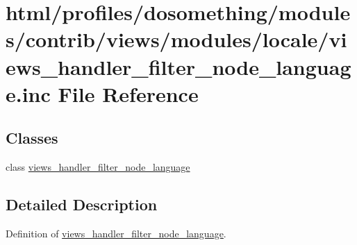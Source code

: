 \hypertarget{views__handler__filter__node__language_8inc}{
\section{html/profiles/dosomething/modules/contrib/views/modules/locale/views\_\-handler\_\-filter\_\-node\_\-language.inc File Reference}
\label{views__handler__filter__node__language_8inc}
}
\subsection*{Classes}
\begin{DoxyCompactItemize}
\item 
class \hyperlink{classviews__handler__filter__node__language}{views\_\-handler\_\-filter\_\-node\_\-language}
\end{DoxyCompactItemize}


\subsection{Detailed Description}
Definition of \hyperlink{classviews__handler__filter__node__language}{views\_\-handler\_\-filter\_\-node\_\-language}. 